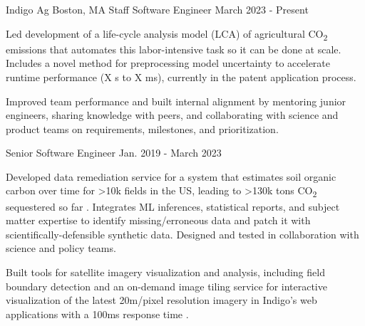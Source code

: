 \documentclass[11pt, a4paper]{awesome-cv}
\begin{document}
\begin{cventries}




  \cventrydouble
    {Indigo Ag}  %
    {Boston, MA}  %
    {Staff Software Engineer}  %
    {March 2023 - Present}  %
    {
    \begin{cvitems}
      \item Led development of a life-cycle analysis model (LCA) of agricultural CO\textsubscript{2} emissions that automates this labor-intensive task so it can be done at scale. Includes a novel method for preprocessing model uncertainty to accelerate runtime performance (X s to X ms), currently in the patent application process. 
      \item Improved team performance and built internal alignment by mentoring junior engineers, sharing knowledge with peers, and collaborating with science and product teams on requirements, milestones, and prioritization.
    \end{cvitems}
    }
    {Senior Software Engineer}  %
    {Jan. 2019 - March 2023}  %
    {
    \begin{cvitems}
      \item Developed data remediation service for a system that estimates soil organic carbon over time for >10k fields in the US, leading to >130k tons CO\textsubscript{2} sequestered so far . Integrates ML inferences, statistical reports, and subject matter expertise to identify missing/erroneous data and patch it with scientifically-defensible synthetic data. Designed and tested in collaboration with science and policy teams.
      \item Built tools for satellite imagery visualization and analysis, including field boundary detection  and an on-demand image tiling service for interactive visualization of the latest 20m/pixel resolution imagery in Indigo’s web applications with a 100ms response time .
    \end{cvitems}
    }


\end{cventries}
\end{document}
